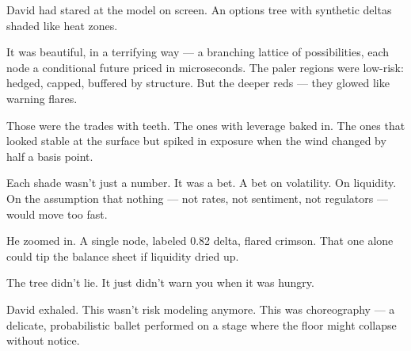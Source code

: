 \medskip

David had stared at the model on screen.
An options tree with synthetic deltas shaded like heat zones.

It was beautiful, in a terrifying way — a branching lattice of possibilities, each node a 
conditional future priced in microseconds.
The paler regions were low-risk: hedged, capped, buffered by structure.
But the deeper reds — they glowed like warning flares.

Those were the trades with teeth.
The ones with leverage baked in.
The ones that looked stable at the surface but spiked in exposure when the wind changed by 
half a basis point.

Each shade wasn’t just a number.
It was a bet.
A bet on volatility. On liquidity. On the assumption that nothing — not rates, not sentiment, 
not regulators — would move too fast.

He zoomed in. A single node, labeled 0.82 delta, flared crimson.
That one alone could tip the balance sheet if liquidity dried up.

The tree didn’t lie.
It just didn’t warn you when it was hungry.

David exhaled.
This wasn’t risk modeling anymore.
This was choreography — a delicate, probabilistic ballet performed on a stage where the floor might collapse without notice.

\medskip


